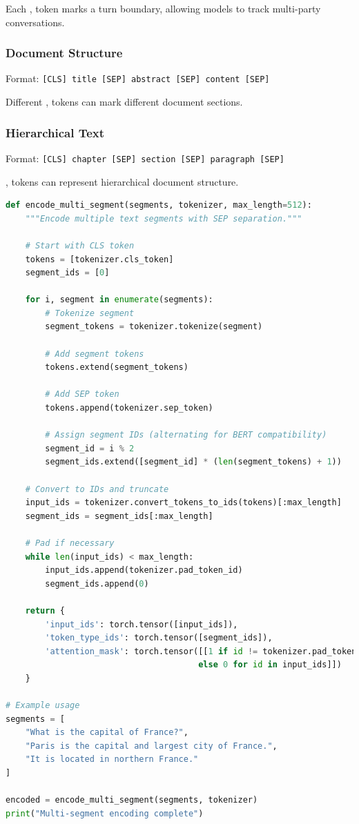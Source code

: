 Each \sep{} token marks a turn boundary, allowing models to track multi-party conversations.

\subsubsection{Document Structure}
Format: \texttt{[CLS] title [SEP] abstract [SEP] content [SEP]}

Different \sep{} tokens can mark different document sections.

\subsubsection{Hierarchical Text}
Format: \texttt{[CLS] chapter [SEP] section [SEP] paragraph [SEP]}

\sep{} tokens can represent hierarchical document structure.

\begin{lstlisting}[language=Python, caption=Multi-Segment Processing]
def encode_multi_segment(segments, tokenizer, max_length=512):
    """Encode multiple text segments with SEP separation."""
    
    # Start with CLS token
    tokens = [tokenizer.cls_token]
    segment_ids = [0]
    
    for i, segment in enumerate(segments):
        # Tokenize segment
        segment_tokens = tokenizer.tokenize(segment)
        
        # Add segment tokens
        tokens.extend(segment_tokens)
        
        # Add SEP token
        tokens.append(tokenizer.sep_token)
        
        # Assign segment IDs (alternating for BERT compatibility)
        segment_id = i % 2
        segment_ids.extend([segment_id] * (len(segment_tokens) + 1))
    
    # Convert to IDs and truncate
    input_ids = tokenizer.convert_tokens_to_ids(tokens)[:max_length]
    segment_ids = segment_ids[:max_length]
    
    # Pad if necessary
    while len(input_ids) < max_length:
        input_ids.append(tokenizer.pad_token_id)
        segment_ids.append(0)
    
    return {
        'input_ids': torch.tensor([input_ids]),
        'token_type_ids': torch.tensor([segment_ids]),
        'attention_mask': torch.tensor([[1 if id != tokenizer.pad_token_id 
                                       else 0 for id in input_ids]])
    }

# Example usage
segments = [
    "What is the capital of France?",
    "Paris is the capital and largest city of France.",
    "It is located in northern France."
]

encoded = encode_multi_segment(segments, tokenizer)
print("Multi-segment encoding complete")
\end{lstlisting}

